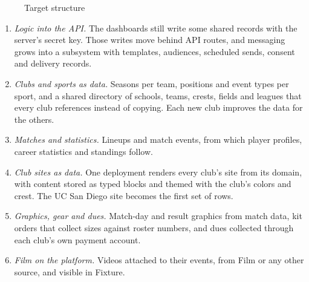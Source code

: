 \documentclass[letterpaper,11pt]{article}
\begin{document}
\begin{figure}[H]
\caption{Target structure}\label{f:target}
\end{figure}

\begin{enumerate}
\item \textit{Logic into the API.} The dashboards still write some shared records with the
server's secret key. Those writes move behind API routes, and messaging grows into a subsystem
with templates, audiences, scheduled sends, consent and delivery records.
\item \textit{Clubs and sports as data.} Seasons per team, positions and event types per sport,
and a shared directory of schools, teams, crests, fields and leagues that every club references
instead of copying. Each new club improves the data for the others.
\item \textit{Matches and statistics.} Lineups and match events, from which player profiles,
career statistics and standings follow.
\item \textit{Club sites as data.} One deployment renders every club's site from its domain, with
content stored as typed blocks and themed with the club's colors and crest. The UC San Diego site
becomes the first set of rows.
\item \textit{Graphics, gear and dues.} Match-day and result graphics from match data, kit orders
that collect sizes against roster numbers, and dues collected through each club's own payment
account.
\item \textit{Film on the platform.} Videos attached to their events, from Film or any other
source, and visible in Fixture.
\end{enumerate}
\end{document}
